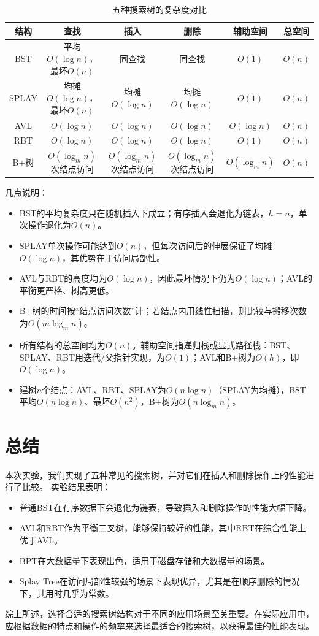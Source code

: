 \documentclass[openany]{book}
\begin{document}
\begin{table}[H]
  \centering
  \small
  \renewcommand{\arraystretch}{1.3}
  \caption{五种搜索树的复杂度对比}
  \label{tab:complexity}
  \begin{tabular}{|c|c|c|c|c|c|}
    \hline
    结构 & 查找 & 插入 & 删除 & 辅助空间 & 总空间 \\
    \hline
    BST   & 平均$O(\log n)$，最坏$O(n)$ & 同查找 & 同查找 & $O(1)$ & $O(n)$ \\
    \hline
    SPLAY & 均摊$O(\log n)$，最坏$O(n)$ & 均摊$O(\log n)$ & 均摊$O(\log n)$ & $O(1)$ & $O(n)$ \\
    \hline
    AVL   & $O(\log n)$ & $O(\log n)$ & $O(\log n)$ & $O(\log n)$ & $O(n)$ \\
    \hline
    RBT   & $O(\log n)$ & $O(\log n)$ & $O(\log n)$ & $O(1)$ & $O(n)$ \\
    \hline
    B+树  & $O(\log_m n)$次结点访问 & $O(\log_m n)$次结点访问 & $O(\log_m n)$次结点访问 & $O(\log_m n)$ & $O(n)$ \\
    \hline
  \end{tabular}
\end{table}

几点说明：
\begin{itemize}
  \item BST的平均复杂度只在随机插入下成立；有序插入会退化为链表，$h=n$，单次操作退化为$O(n)$。
  \item SPLAY单次操作可能达到$O(n)$，但每次访问后的伸展保证了均摊$O(\log n)$，其优势在于访问局部性。
  \item AVL与RBT的高度均为$O(\log n)$，因此最坏情况下仍为$O(\log n)$；AVL的平衡更严格、树高更低。
  \item B+树的时间按“结点访问次数”计；若结点内用线性扫描，则比较与搬移次数为$O(m\log_m n)$。
  \item 所有结构的总空间均为$O(n)$。辅助空间指递归栈或显式路径栈：BST、SPLAY、RBT用迭代/父指针实现，为$O(1)$；AVL和B+树为$O(h)$，即$O(\log n)$。
  \item 建树$n$个结点：AVL、RBT、SPLAY为$O(n\log n)$（SPLAY为均摊），BST平均$O(n\log n)$、最坏$O(n^2)$，B+树为$O(n\log_m n)$。
\end{itemize}

\chapter{总结}
本次实验，我们实现了五种常见的搜索树，并对它们在插入和删除操作上的性能进行了比较。
实验结果表明：
\begin{itemize}
    \item 普通BST在有序数据下会退化为链表，导致插入和删除操作的性能大幅下降。
    \item AVL和RBT作为平衡二叉树，能够保持较好的性能，其中RBT在综合性能上优于AVL。
    \item BPT在大数据量下表现出色，适用于磁盘存储和大数据量的场景。
    \item Splay Tree在访问局部性较强的场景下表现优异，尤其是在顺序删除的情况下，其用时几乎为常数。
\end{itemize}

综上所述，选择合适的搜索树结构对于不同的应用场景至关重要。在实际应用中，应根据数据的特点和操作的频率来选择最适合的搜索树，以获得最佳的性能表现。
\end{document}
